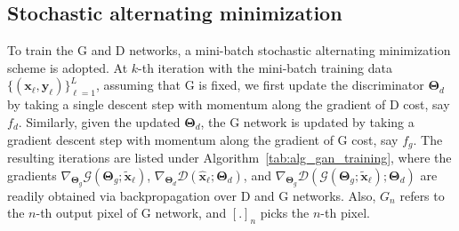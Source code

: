 \documentclass{journal}
\def \cD {\mathcal{D}}
\def \cG {\mathcal{G}}
\def \bPhi {\boldsymbol{\Phi}}
\def \bTheta {\boldsymbol{\Theta}}
\def \by {\mathbf{y}}
\def \bx {\mathbf{x}}
\begin{document}
\subsection{Stochastic alternating minimization}
\label{subsec:alt_min}
%
To train the G and D networks, a mini-batch stochastic alternating minimization scheme is adopted. At $k$-th iteration with the mini-batch training data $\{(\bx_{\ell},\by_{\ell})\}_{\ell=1}^L$, assuming that G is fixed, we first update the discriminator $\bTheta_d$ by taking a single descent step with momentum along the gradient of D cost, say $f_d$. Similarly, given the updated $\bTheta_d$, the G network is updated by taking a gradient descent step with momentum along the gradient of G cost, say $f_g$. The resulting iterations are listed under Algorithm~\ref{tab:alg_gan_training}, where the gradients $\nabla_{\bTheta_g}\cG(\bTheta_g;\tilde{\bx}_{\ell})$, $\nabla_{\bTheta_d}\cD(\hat{\bx}_{\ell};\bTheta_d)$, and $\nabla_{\bTheta_g}\cD(\cG(\bTheta_g;\tilde{\bx}_{\ell});\bTheta_d)$ are readily obtained via backpropagation over D and G networks. Also, $G_n$ refers to the $n$-th output pixel of G network, and $[.]_n$ picks the $n$-th pixel.  

%




\end{document}
